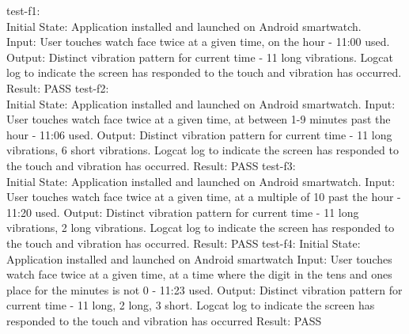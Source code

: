 \documentclass[12pt, titlepage]{article}
\begin{document}
test-f1: \\
Initial State: Application installed and launched on Android smartwatch.\\
Input: User touches watch face twice at a given time, on the hour - 11:00 used.\\
Output: Distinct vibration pattern for current time - 11 long vibrations. Logcat log to indicate the screen has responded to the touch and vibration has occurred.  
Result: PASS
\newline
\newline
\noindent
test-f2: \\
Initial State: Application installed and launched on Android smartwatch. 
	\noindent				
Input: User touches watch face twice at a given time, at between 1-9 minutes past the hour - 11:06 used.
	\noindent				
Output: Distinct vibration pattern for current time - 11 long vibrations, 6 short vibrations. Logcat log to indicate the screen has responded to the touch and vibration has occurred.  
\noindent
Result: PASS
\newline
\newline
\noindent
test-f3: \\
Initial State: Application installed and launched on Android smartwatch.
\newline
\noindent
Input: User touches watch face twice at a given time, at a multiple of
10 past the hour - 11:20 used.
\newline
\noindent
Output: Distinct vibration pattern for current time - 11 long vibrations, 2 long vibrations. Logcat log to indicate the screen has responded to the touch and vibration has occurred.
\newline
\noindent
Result: PASS
\newline
\newline
\noindent
test-f4:
\newline
\noindent
Initial State: Application installed and launched on Android smartwatch
\newline
\noindent
Input: User touches watch face twice at a given time, at a time where
the digit in the tens and ones place for the minutes is not 0 - 11:23 used.
\newline
\noindent
Output: Distinct vibration pattern for current time - 11 long, 2 long, 3 short. Logcat log to indicate the screen has responded to the touch and vibration has occurred
\newline
\noindent
Result: PASS
\newline
\noindent
\newline
\end{document}
